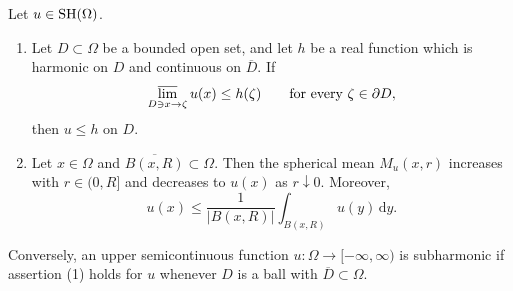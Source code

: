 \begin{theorem}\label{thm:subharmonic-comparison}
Let $u\in\mathrm{SH}(\Omega)$.
\begin{enumerate}
\item Let $D\subset\Omega$ be a bounded open set, and let $h$ be a real function which is harmonic on $D$ and continuous on $\overline D$. If
\[
 \varlimsup_{D\ni x\to\zeta}u(x)\leq h(\zeta)\qquad\text{for every }\zeta\in\partial D,
\]
then $u\leq h$ on $D$.
\item Let $x\in\Omega$ and $\overline{B(x,R)}\subset\Omega$. Then the spherical mean $M_u(x,r)$ increases with $r\in(0,R]$ and decreases to $u(x)$ as $r\downarrow0$. Moreover,
\[
 u(x)\leq\frac{1}{|B(x,R)|}\int_{B(x,R)}u(y)\,\mathrm d y.
\]
\end{enumerate}
Conversely, an upper semicontinuous function $u\colon\Omega\to[-\infty,\infty)$ is subharmonic if assertion \textup{(1)} holds for $u$ whenever $D$ is a ball with $\overline D\subset\Omega$.
\end{theorem}
